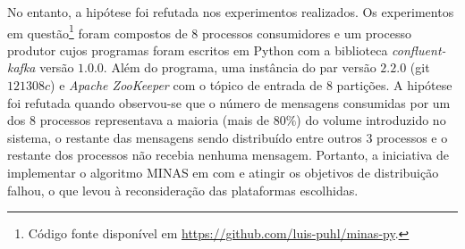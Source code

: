 No entanto, a hipótese foi refutada nos experimentos realizados.
Os experimentos em questão\footnote{Código fonte disponível em
\url{https://github.com/luis-puhl/minas-py}.} foram compostos de 8 processos
consumidores e um processo produtor cujos programas foram escritos em Python com
a biblioteca \emph{confluent-kafka} versão $1.0.0$.
Além do programa, uma instância do par \kafka versão $2.2.0$ (git $121308c$) e
\emph{Apache ZooKeeper} com o tópico de entrada de 8 partições.
A hipótese foi refutada quando observou-se que o número de
mensagens consumidas por um dos $8$ processos representava a maioria (mais de
$80\%$) do volume introduzido no sistema, o restante das mensagens sendo distribuído entre
outros $3$ processos e o restante dos processos não recebia nenhuma mensagem.
Portanto, a iniciativa de implementar o algoritmo MINAS em \python com \kafka e
atingir os objetivos de distribuição falhou, o que levou à reconsideração das
plataformas escolhidas.





